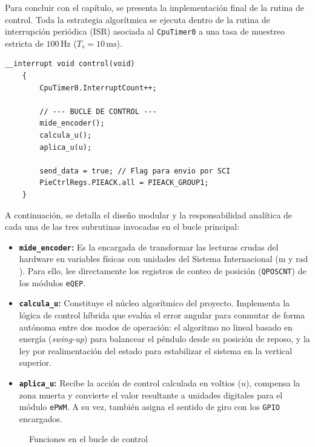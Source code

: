 \documentclass[11pt,fleqn]{book} %
\begin{document}
Para concluir con el capítulo, se presenta la implementación final de la rutina de control. Toda la estrategia algorítmica se ejecuta dentro de la rutina de interrupción periódica (ISR) asociada al \texttt{CpuTimer0} a una tasa de muestreo estricta de $100\,\text{Hz}$ ($T_s = 10\,\text{ms}$). 

\begin{lstlisting}[style=estiloC, caption={Rutina de control principal (ISR).}, label={code:rutina_de_control}]
	__interrupt void control(void)
	{
		CpuTimer0.InterruptCount++; 
		
		// --- BUCLE DE CONTROL ---
		mide_encoder();
		calcula_u();
		aplica_u(u); 
		
		send_data = true; // Flag para envio por SCI
		PieCtrlRegs.PIEACK.all = PIEACK_GROUP1;
	}
\end{lstlisting}

A continuación, se detalla el diseño modular y la responsabilidad analítica de cada una de las tres subrutinas invocadas en el bucle principal:
\begin{itemize}
	\item \textbf{\texttt{mide\_encoder}:} Es la encargada de transformar las lecturas crudas del hardware en variables físicas con unidades del Sistema Internacional ($\text{m}$ y $\text{rad}$). Para ello, lee directamente los registros de conteo de posición (\texttt{QPOSCNT}) de los módulos \texttt{eQEP}.
	
	\item \textbf{\texttt{calcula\_u}:} Constituye el núcleo algorítmico del proyecto. Implementa la lógica de control híbrida que evalúa el error angular para conmutar de forma autónoma entre dos modos de operación: el algoritmo no lineal basado en energía (\textit{swing-up}) para balancear el péndulo desde su posición de reposo, y la ley por realimentación del estado para estabilizar el sistema en la vertical superior.
	
	\item \textbf{\texttt{aplica\_u}:} Recibe la acción de control calculada en voltios ($u$), compensa la zona muerta y convierte el valor resultante a unidades digitales para el módulo \texttt{ePWM}. A su vez, también asigna el sentido de giro con los \texttt{GPIO} encargados.
\end{itemize}

\begin{figure}[!htbp] %
	\centering
	\resizebox{\textwidth}{!}{%
		
	}
	\caption{Funciones en el bucle de control}
	\label{fig:implement_control}
\end{figure}
\end{document}
